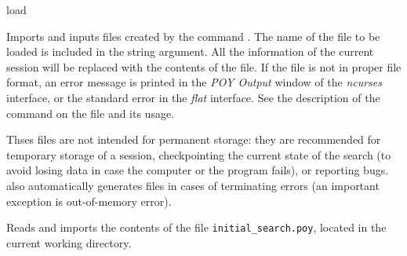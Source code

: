 \begin{command}{load}{}

\syntax{\obligatory{(\poystring)}} 

\begin{poydescription}
Imports and inputs \poy files created by the command
. The name of the file to be loaded
is included in the string argument. All the information of
the current \poy session will be replaced with the contents
of the \poy file. If the file is not in proper \poy file
format, an error message is printed in the \emph{POY Output}
window of the \emph{ncurses} interface, or the standard error 
in the \emph{flat} interface. See the description of the command 
 on the \poy file and its usage.

Thses \poy files are not intended for permanent storage: they are recommended
for temporary storage of a \poy session, checkpointing
the current state of the search (to avoid losing data in case the computer or the
program fails), or reporting bugs. \poy also automatically
generates \poy files in cases of terminating errors (an important exception is
out-of-memory error).

\end{poydescription}

\begin{poyexamples}
{Reads and imports the contents of the \poy file
\texttt{initial\_search.poy}, located in the current working
directory.}
\end{poyexamples}

\begin{poyalso}
\end{poyalso}

\end{command}


